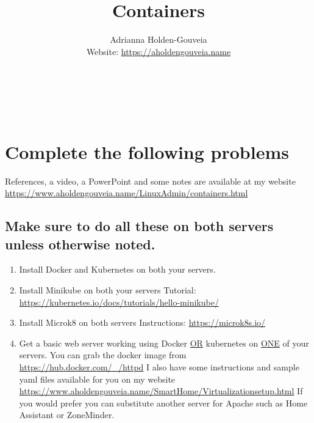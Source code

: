 \documentclass[12pt]{article}
\title{Containers}
\author{
        Adrianna Holden-Gouveia \\
        Website: \url{https://aholdengouveia.name}\\ 
        \date{\vspace{-5ex}}
        \faLinkedin{: aholdengouveia} \\
        \faGithub {: aholdengouveia} \\
        \faTwitter {: aholdengouveia} \\
        }
\begin{document}
    

\maketitle




\section*{Complete the following problems}

References, a video, a PowerPoint and some notes are available at my website
\url {https://www.aholdengouveia.name/LinuxAdmin/containers.html}

\subsection*{Make sure to do all these on both servers unless otherwise noted.}
    \begin{enumerate}
        \item Install Docker and Kubernetes on both your servers.
        \item Install Minikube on both your servers 
            \subitem Tutorial: \url{https://kubernetes.io/docs/tutorials/hello-minikube/}
        \item Install Microk8 on both servers
            \subitem Instructions: \url{https://microk8s.io/}
        \item Get a basic web server working using Docker \underline{OR} kubernetes on \underline{ONE} of your servers. 
            \subitem You can grab the docker image from \url{https://hub.docker.com/_/httpd}  
            \subitem I also have some instructions and sample yaml files available for you on my website \url{https://www.aholdengouveia.name/SmartHome/Virtualizationsetup.html}  
            \subitem If you would prefer you can substitute another server for Apache such as Home Assistant or ZoneMinder.
    \end{enumerate}
\end{document}
